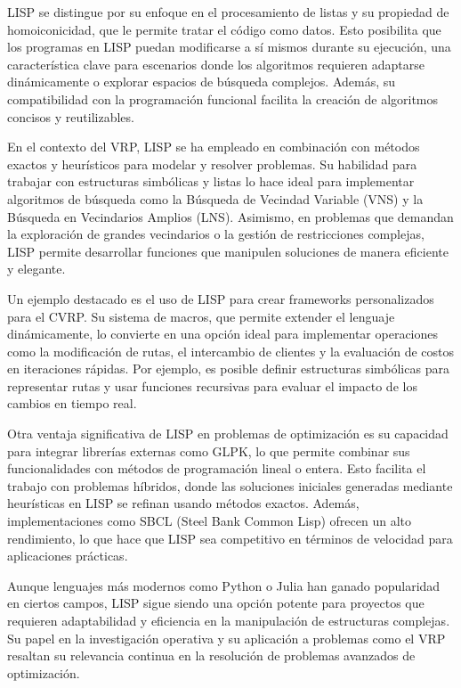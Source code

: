 \documentclass{article}
\begin{document}
LISP se distingue por su enfoque en el procesamiento de listas y su propiedad de homoiconicidad, que le permite tratar el código como datos. Esto posibilita que los programas en LISP puedan modificarse a sí mismos durante su ejecución, una característica clave para escenarios donde los algoritmos requieren adaptarse dinámicamente o explorar espacios de búsqueda complejos. Además, su compatibilidad con la programación funcional facilita la creación de algoritmos concisos y reutilizables.

En el contexto del VRP, LISP se ha empleado en combinación con métodos exactos y heurísticos para modelar y resolver problemas. Su habilidad para trabajar con estructuras simbólicas y listas lo hace ideal para implementar algoritmos de búsqueda como la Búsqueda de Vecindad Variable (VNS) y la Búsqueda en Vecindarios Amplios (LNS). Asimismo, en problemas que demandan la exploración de grandes vecindarios o la gestión de restricciones complejas, LISP permite desarrollar funciones que manipulen soluciones de manera eficiente y elegante.

Un ejemplo destacado es el uso de LISP para crear frameworks personalizados para el CVRP. Su sistema de macros, que permite extender el lenguaje dinámicamente, lo convierte en una opción ideal para implementar operaciones como la modificación de rutas, el intercambio de clientes y la evaluación de costos en iteraciones rápidas. Por ejemplo, es posible definir estructuras simbólicas para representar rutas y usar funciones recursivas para evaluar el impacto de los cambios en tiempo real.

Otra ventaja significativa de LISP en problemas de optimización es su capacidad para integrar librerías externas como GLPK, lo que permite combinar sus funcionalidades con métodos de programación lineal o entera. Esto facilita el trabajo con problemas híbridos, donde las soluciones iniciales generadas mediante heurísticas en LISP se refinan usando métodos exactos. Además, implementaciones como SBCL (Steel Bank Common Lisp) ofrecen un alto rendimiento, lo que hace que LISP sea competitivo en términos de velocidad para aplicaciones prácticas.

Aunque lenguajes más modernos como Python o Julia han ganado popularidad en ciertos campos, LISP sigue siendo una opción potente para proyectos que requieren adaptabilidad y eficiencia en la manipulación de estructuras complejas. Su papel en la investigación operativa y su aplicación a problemas como el VRP resaltan su relevancia continua en la resolución de problemas avanzados de optimización.



 
\end{document}
